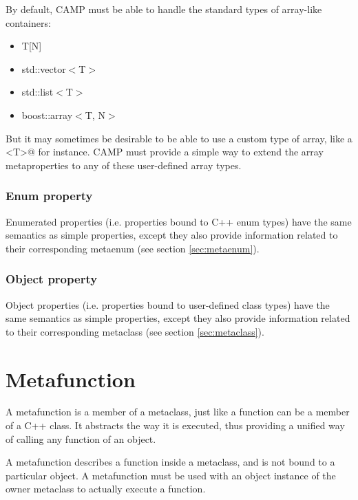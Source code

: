 \documentclass[a4paper, twoside]{report}
\begin{document}
	By default, CAMP must be able to handle the standard types of array-like containers:
	
	\begin{itemize}
		\item T[N]
		\item std::vector$<$T$>$
		\item std::list$<$T$>$
		\item boost::array$<$T, N$>$
	\end{itemize}
	
	But it may sometimes be desirable to be able to use a custom type of array, like a @ for instance.
	CAMP must provide	a simple way to extend the array metaproperties to any of these user-defined array types.

\subsubsection{Enum property}
\label{sec:metaproperty-enum}

	Enumerated properties (i.e. properties bound to C++ enum types) have the same semantics as simple properties,
	except they also provide information related to their corresponding metaenum (see section \ref{sec:metaenum}).

\subsubsection{Object property}
\label{sec:metaproperty-object}

	Object properties (i.e. properties bound to user-defined class types) have the same semantics as simple properties,
	except they also provide information related to their corresponding metaclass (see section \ref{sec:metaclass}).

\section{Metafunction}
\label{sec:metafunction}

	A metafunction is a member of a metaclass, just like a function can be a member of a C++ class. It abstracts
	the way it is executed, thus providing a unified way of calling any function of an object.

	A metafunction describes a function inside a metaclass, and is not bound to a particular object. A metafunction
	must be used with an object instance of the owner metaclass to actually execute a function.
\end{document}
